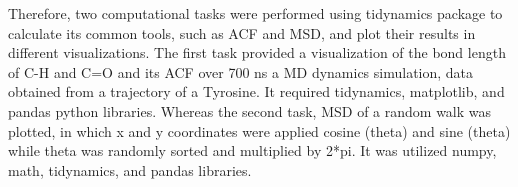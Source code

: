 \documentclass{article}
\begin{document}
Therefore, two computational tasks were performed using tidynamics package to calculate its common tools, such as ACF and MSD, and plot their results in different visualizations. The first task provided a visualization of the bond length of C-H and C=O and its ACF over 700 ns a MD dynamics simulation, data obtained from a trajectory of a Tyrosine. It required tidynamics, matplotlib, and pandas python libraries. Whereas the second task, MSD of a random walk was plotted, in which x and y coordinates were applied cosine (theta) and sine (theta) while theta was randomly sorted and multiplied by 2*pi. It was utilized numpy, math, tidynamics, and pandas libraries. 



\end{document}

